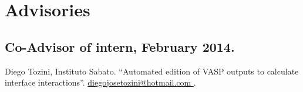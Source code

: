 \section{Advisories}

\subsection{Co-Advisor of intern, February 2014.} Diego Tozini, Instituto Sabato. “Automated edition
of VASP outputs to calculate interface interactions”. \url{diegojosetozini@hotmail.com
}.

